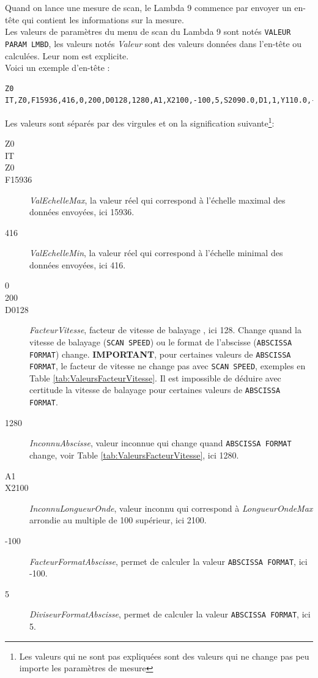 \documentclass[a4paper, 12pt]{article}
\begin{document}
Quand on lance une mesure de scan, le Lambda 9 commence par envoyer un en-tête qui contient les informations sur la mesure.\\
Les valeurs de paramètres du menu de scan du Lambda 9 sont notés \verb|VALEUR PARAM LMBD|, les valeurs notés \emph{Valeur} sont des valeurs données dans l'en-tête ou calculées.
Leur nom est explicite.\\
Voici un exemple d'en-tête :
\begin{lstlisting}
Z0
IT,Z0,F15936,416,0,200,D0128,1280,A1,X2100,-100,5,S2090.0,D1,1,Y110.0,-22.000,4,Z0,D0128,1280,L1
\end{lstlisting}
Les valeurs sont séparés par des virgules et on la signification suivante\footnote{Les valeurs qui ne sont pas expliquées sont des valeurs qui ne change pas peu importe les paramètres de mesure}:
\begin{description}
	\item[Z0]
	\item[IT]
	\item[Z0]
	\item[F15936] \emph{ValEchelleMax}, la valeur réel qui correspond à l'échelle maximal des données envoyées, ici 15936.
	\item[416] \emph{ValEchelleMin}, la valeur réel qui correspond à l'échelle minimal des données envoyées, ici 416.
	\item[0]
	\item[200]
	\item[D0128]  \emph{FacteurVitesse}, facteur de vitesse de balayage , ici 128.
		Change quand la vitesse de balayage (\verb|SCAN SPEED|) ou le format de l'abscisse (\verb|ABSCISSA FORMAT|) change.
		\textbf{IMPORTANT}, pour certaines valeurs de \verb|ABSCISSA FORMAT|, le facteur de vitesse ne change pas avec \verb|SCAN SPEED|, exemples en Table \ref{tab:ValeursFacteurVitesse}.
		Il est impossible de déduire avec certitude la vitesse de balayage pour certaines valeurs de \verb|ABSCISSA FORMAT|.
	\item[1280] \emph{InconnuAbscisse}, valeur inconnue qui change quand \verb|ABSCISSA FORMAT| change, voir Table \ref{tab:ValeursFacteurVitesse}, ici 1280. 
	\item[A1]
	\item[X2100] \emph{InconnuLongueurOnde}, valeur inconnu qui correspond à \emph{LongueurOndeMax} arrondie au multiple de 100 supérieur, ici 2100.
	\item[-100] \emph{FacteurFormatAbscisse}, permet de calculer la valeur \verb|ABSCISSA FORMAT|, ici -100.
	\item[5] \emph{DiviseurFormatAbscisse}, permet de calculer la valeur \verb|ABSCISSA FORMAT|, ici 5.

\end{description}
\end{document}
